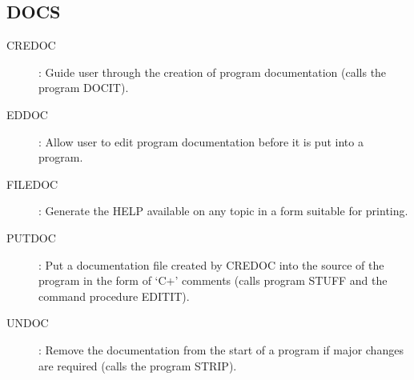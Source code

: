 \subsection {DOCS}
\begin{description}
\item [CREDOC]: Guide user through the creation of program documentation
(calls the program DOCIT).
\item [EDDOC]: Allow user to edit program documentation before it is put into a
program.
\item [FILEDOC]: Generate the HELP available on any topic in a form
suitable for printing.
\item [PUTDOC]: Put a documentation file created by CREDOC into the source of
the program in the form of `C+' comments (calls program STUFF and the command
procedure EDITIT).
\item [UNDOC]: Remove the documentation from the start of a program if major
changes are required (calls the program STRIP).
\end{description}

